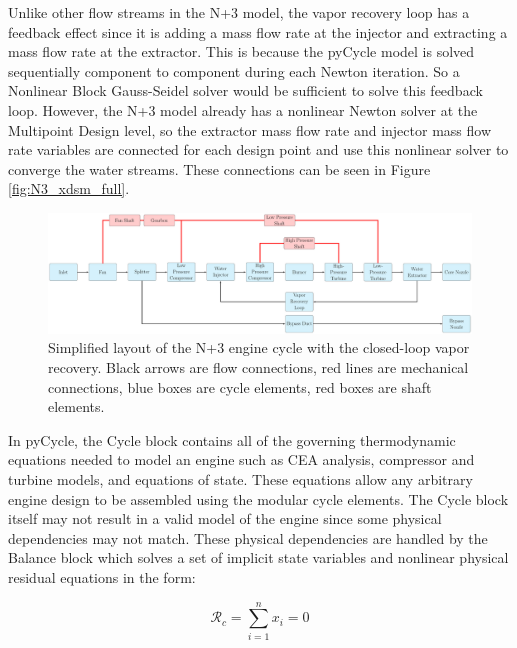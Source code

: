 \documentclass[conf]{new-aiaa}
\begin{document}
Unlike other flow streams in the N+3 model, the vapor recovery loop has a feedback effect since it is adding a mass flow rate at the injector and extracting a mass flow rate at the extractor.
This is because the pyCycle model is solved sequentially component to component during each Newton iteration.
So a Nonlinear Block Gauss-Seidel solver would be sufficient to solve this feedback loop.
However, the N+3 model already has a nonlinear Newton solver at the Multipoint Design level, so the extractor mass flow rate and injector mass flow rate variables are connected for each design point and use this nonlinear solver to converge the water streams.
These connections can be seen in Figure \ref{fig:N3_xdsm_full}.

\begin{figure}[hbt!]
    \centering
    \includegraphics[width=1.0\textwidth]{N3_CLVR_cycle.pdf}
    \caption{
        Simplified layout of the N+3 engine cycle with the closed-loop vapor recovery.
        Black arrows are flow connections, red lines are mechanical connections, blue boxes are cycle elements, red boxes are shaft elements.
    }
    \label{fig:n3_clvr}
\end{figure}

In pyCycle, the Cycle block contains all of the governing thermodynamic equations needed to model an engine such as CEA analysis, compressor and turbine models, and equations of state.
These equations allow any arbitrary engine design to be assembled using the modular cycle elements.
The Cycle block itself may not result in a valid model of the engine since some physical dependencies may not match.
These physical dependencies are handled by the Balance block which solves a set of implicit state variables and nonlinear physical residual equations in the form:

\begin{equation}
    \mathcal{R}_c = \sum_{i=1}^{n} x_i = 0
\end{equation}
\end{document}
